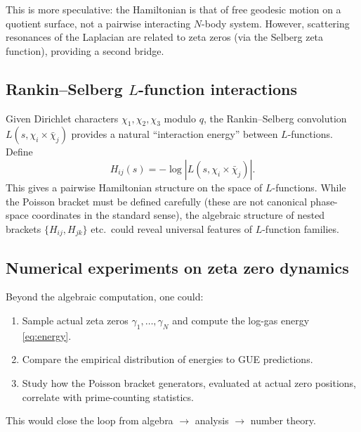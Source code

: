 \documentclass[11pt,a4paper]{article}
\begin{document}
This is more speculative: the Hamiltonian is that of free geodesic
motion on a quotient surface, not a pairwise interacting $N$-body
system. However, scattering resonances of the Laplacian are related to
zeta zeros (via the Selberg zeta function), providing a second bridge.

\subsection{Rankin--Selberg $L$-function interactions}

Given Dirichlet characters $\chi_1, \chi_2, \chi_3$ modulo $q$, the
Rankin--Selberg convolution $L(s, \chi_i \times \bar\chi_j)$ provides
a natural ``interaction energy'' between $L$-functions. Define
\[
  H_{ij}(s) = -\log|L(s, \chi_i \times \bar\chi_j)|.
\]
This gives a pairwise Hamiltonian structure on the space of $L$-functions.
While the Poisson bracket must be defined carefully (these are not
canonical phase-space coordinates in the standard sense), the algebraic
structure of nested brackets $\{H_{ij}, H_{jk}\}$ etc.\ could reveal
universal features of $L$-function families.

\subsection{Numerical experiments on zeta zero dynamics}

Beyond the algebraic computation, one could:
\begin{enumerate}
  \item Sample actual zeta zeros $\gamma_1, \ldots, \gamma_N$ and
    compute the log-gas energy \eqref{eq:energy}.
  \item Compare the empirical distribution of energies to GUE predictions.
  \item Study how the Poisson bracket generators, evaluated at actual
    zero positions, correlate with prime-counting statistics.
\end{enumerate}
This would close the loop from algebra $\to$ analysis $\to$ number theory.

\end{document}
